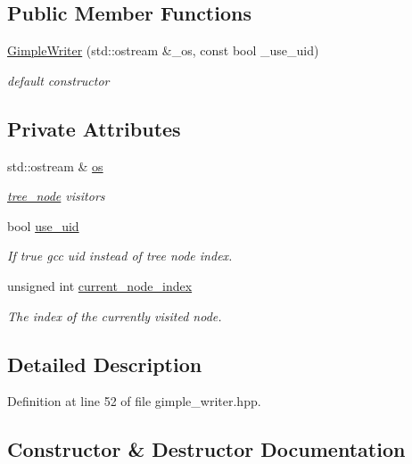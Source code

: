 \subsection*{Public Member Functions}
\begin{DoxyCompactItemize}
\item 
\hyperlink{structGimpleWriter_a1e0507168bb97876b36eb3e7e2d779df}{Gimple\+Writer} (std\+::ostream \&\+\_\+os, const bool \+\_\+use\+\_\+uid)
\begin{DoxyCompactList}\small\item\em default constructor \end{DoxyCompactList}\end{DoxyCompactItemize}
\subsection*{Private Attributes}
\begin{DoxyCompactItemize}
\item 
std\+::ostream \& \hyperlink{structGimpleWriter_aeb1a127b1ff523fa56220aac5601816d}{os}
\begin{DoxyCompactList}\small\item\em \hyperlink{classtree__node}{tree\+\_\+node} visitors \end{DoxyCompactList}\item 
bool \hyperlink{structGimpleWriter_afe093493822b7caeaf9cc5bc44d149e3}{use\+\_\+uid}
\begin{DoxyCompactList}\small\item\em If true gcc uid instead of tree node index. \end{DoxyCompactList}\item 
unsigned int \hyperlink{structGimpleWriter_af30b2794d82d4be967a6a011a57ac51b}{current\+\_\+node\+\_\+index}
\begin{DoxyCompactList}\small\item\em The index of the currently visited node. \end{DoxyCompactList}\end{DoxyCompactItemize}


\subsection{Detailed Description}


Definition at line 52 of file gimple\+\_\+writer.\+hpp.



\subsection{Constructor \& Destructor Documentation}
\mbox{\label{structGimpleWriter_a1e0507168bb97876b36eb3e7e2d779df}} 
